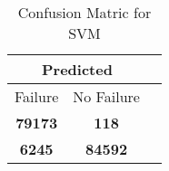 \begin{table}[] 
\caption{Confusion Matric for SVM} 
\label{Table: Prediction Accuracy-NoneSVMOnlySunEKF-ignoreReflection-Reflection} 
\centering 
\begin{tabular} 
 {@{}ccc@{}} 
\toprule 
\multicolumn{2}{c}{\textbf{Predicted}}
 \\ \midrule 
\multicolumn{1}{|c|}{Failure} & 
\multicolumn{1}{c|}{No Failure}
 \\ \midrule 
\multicolumn{1}{|c|}{\color{green}\textbf{79173}} & 
\multicolumn{1}{c|}{\color{red}\textbf{118}}
 \\ \midrule 
\multicolumn{1}{|c|}{\color{red}\textbf{6245}} & 
\multicolumn{1}{c|}{\color{green}\textbf{84592}}
 \\ \bottomrule 
\end{tabular} 
\end{table} 
